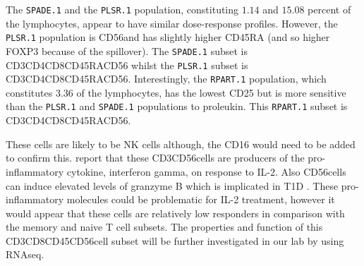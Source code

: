The \texttt{SPADE.1} and the \texttt{PLSR.1} population, constituting $1.14$ and $15.08$ percent of the lymphocytes, appear to have similar dose-response profiles.
However, the \texttt{PLSR.1} population is CD56\negative and has slightly higher CD45RA (and so higher FOXP3 because of the spillover).
The \texttt{SPADE.1} subset is CD3\positive CD4\negative CD8\positive CD45RA\positive CD56\positive
whilst the \texttt{PLSR.1} subset is CD3\positive CD4\negative CD8\positive CD45RA\high CD56\negative.
Interestingly, the \texttt{RPART.1} population, which constitutes 3.36 of the lymphocytes, has the lowest CD25 but is more sensitive than the \texttt{PLSR.1} and \texttt{SPADE.1} populations to proleukin.  
This \texttt{RPART.1} subset is CD3\negative CD4\negative CD8\negative CD45RA\positive CD56\positive.

These  cells are likely to be NK cells although, the CD16 would need to be added to confirm this.
\citet{Ortaldo:1992tr} report that these CD3\negative CD56\positive cells are producers of the pro-inflammatory cytokine, interferon gamma, on response to IL-2.
Also CD56\positive cells can induce elevated levels of granzyme B which is implicated in \gls{T1D} \citep{Thomas:2010cy}.
These pro-inflammatory molecules could be problematic for IL-2 treatment, however it would appear that these cells are relatively low responders in comparison with the memory and naive T cell subsets.
The properties and function of this CD3\negative CD8\negative CD45\positive CD56\positive cell subset will be further investigated in our lab by  using RNAseq.


